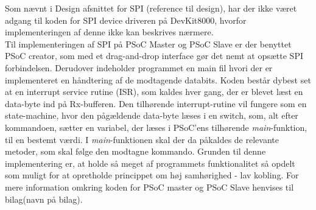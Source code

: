 Som nævnt i Design afsnittet for SPI (reference til design), har der ikke været adgang til koden for SPI device driveren på DevKit8000, hvorfor implementeringen
af denne ikke kan beskrives nærmere. \\

Til implementeringen af SPI på PSoC Master og PSoC Slave er der benyttet PSoC creator, som med et drag-and-drop interface gør det nemt at opsætte SPI forbindelsen. 
Derudover indeholder programmet en main fil hvori der er implementeret en håndtering af de modtagende databits. Koden består dybest set at en interrupt service 
rutine (ISR), som kaldes hver gang, der er blevet læst en data-byte ind på Rx-bufferen. Den tilhørende interrupt-rutine vil fungere som en state-machine, 
hvor den pågældende data-byte læses i en switch, som, alt efter kommandoen, sætter en variabel, der læses i PSoC'ens tilhørende \textit{main}-funktion, til en 
bestemt værdi. I \textit{main}-funktionen skal der da påkaldes de relevante metoder, som skal følge den modtagne kommando. Grunden til denne implementering er, 
at holde så meget af programmets funktionalitet så opdelt som muligt for at opretholde princippet om høj samhørighed - lav kobling. For mere information omkring 
koden for PSoC master og PSoC Slave henvises til bilag(navn på bilag).
